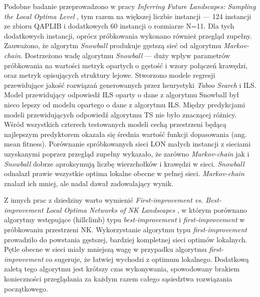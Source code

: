 Podobne badanie przeprowadzono w pracy \textit{Inferring Future Landscapes: Sampling the Local Optima Level} \cite{DBLP:journals/ec/ThomsonOVV20}, tym razem na większej liczbie instancji
--- 124 instancji ze zbioru QAPLIB i dodatkowych 60 instancji o rozmiarze N=11.
Dla tych dodatkowych instancji, oprócz próbkowania wykonano również przegląd zupełny.
Zauważono, że algorytm \textit{Snowball} produkuje gęstszą sieć od algorytmu \textit{Markov-chain}.
Dostrzeżono wadę algorytmu \textit{Snowball} --- duży wpływ parametrów próbkowania na wartości metryk opartych o gęstość
i wzory połączeń krawędzi, oraz metryk opisujących struktury lejowe.
Stworzono modele regresji przewidujące jakość rozwiązań generowanych przez heurystyki \textit{Taboo Search} i ILS.
Model przewidujący odpowiedź ILS oparty o dane z algorytmu Snowball był nieco lepszy od modelu opartego o dane z algorytmu ILS.
Między predykcjami modeli przewidujących odpowiedź algorytmu TS nie było znaczącej różnicy.
Wśród wszystkich czterech testowanych modeli cechą przestrzeni będącą najlepszym predyktorem okazała się średnia wartość
funkcji dopasowania (ang. mean fitness).
Porównanie spróbkowanych sieci LON małych instancji z sieciami uzyskanymi
poprzez przegląd zupełny wykazało, że zarówno \textit{Markov-chain} jak i \textit{Snowball}
dobrze aproksymują liczbę wierzchołków i krawędzi w sieci.
\textit{Snowball} odnalazł prawie wszystkie optima lokalne obecne w pełnej sieci.
\textit{Markov-chain} znalazł ich mniej, ale nadal dawał zadowalający wynik.

Z innych prac z dziedziny warto wymienić \textit{First-improvement vs. Best-improvement Local Optima Networks of NK Landscapes} \cite{DBLP:journals/corr/abs-1207-4455}, w którym porównano algorytmy wstępujące (hillclimb)
typu \textit{best-improvement} i \textit{first-improvement} w próbkowaniu przestrzeni NK.
Wykorzystanie algorytmu typu \textit{first-improvement} prowadziło do powstania gęstszej, bardziej kompletnej sieci optimów lokalnych.
Pętle obecne w sieci miały mniejszą wagę w przypadku algorytmu \textit{first-improvement} co sugeruje, że łatwiej wychodzi z optimum lokalnego.
Dodatkową zaletą tego algorytmu jest krótszy czas wykonywania, spowodowany brakiem konieczności przeglądania za każdym razem całego sąsiedztwa
rozwiązania początkowego.

